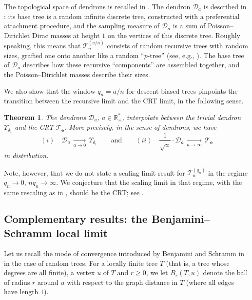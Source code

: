 \documentclass{article}
\newtheorem{theorem}{Theorem}[section]
\theoremstyle{remark}
\newcommand{\bR}{\mathbb{R}}
\newcommand{\cv}[1]{\,\underset{#1}{\longrightarrow}\,}
\newcommand{\cT}{\mathcal{T}}
\newcommand{\cD}{\mathcal{D}}
\newcommand{\be}{\mathbf{e}}
\begin{document}
The topological space of dendrons is recalled in .
The dendron $\cD_a$ is described in :
its base tree is a random infinite discrete tree, constructed with a preferential attachment procedure, and the sampling measure of $\cD_a$ is a sum of Poisson--Dirichlet Dirac masses at height $1$ on the vertices of this discrete tree.
Roughly speaking, this means that $\cT_n^{(a/n)}$ consists of random recursive trees with random sizes, grafted one onto another like a random \enquote{$p$-tree} (see, e.g., \cite{Camarri_Pitman_2000,Blanc-Renaudie_2025}).
The base tree of $\cD_a$ describes how these recursive ``components'' are assembled together, and the Poisson--Dirichlet masses describe their sizes.

We also show that the window $q_n=a/n$ for descent-biased trees pinpoints the transition between the recursive limit and the CRT limit, in the following sense.

\begin{theorem}\label{th: our dendron cv to CRT}
    The dendrons $\cD_a$, $a \in \bR_+^*$, interpolate between the trivial dendron $\Upsilon_{\delta_1}$ and the CRT $\cT_\be$. 
    More precisely, in the sense of dendrons, we have
    \begin{equation*}
        (i)\quad 
        \cD_a \cv{a\to0} \Upsilon_{\delta_1} 
        \qquad\text{and}\qquad
        (ii)\quad 
        \frac{1}{\sqrt a} \cdot \cD_a  \cv{a\to\infty} \cT_\be
    \end{equation*}
    in distribution.
\end{theorem}

Note, however, that we do not state a scaling limit result for $\cT_n^{(q_n)}$ in the regime $q_n\to0$, $nq_n\to\infty$.
We conjecture that the scaling limit in that regime, with the same rescaling as in , should be the CRT; see .


\subsection{Complementary results: the Benjamini--Schramm local limit}

Let us recall the mode of convergence introduced by Benjamini and Schramm in \cite{Benjamini_Schramm_2001} in the case of random trees.
For a locally finite tree $T$ (that is, a tree whose degrees are all finite), a vertex $u$ of $T$ and $r \geq 0$, we let $B_r(T,u)$ denote the ball of radius $r$ around $u$ with respect to the graph distance in $T$ (where all edges have length $1$).
\end{document}
